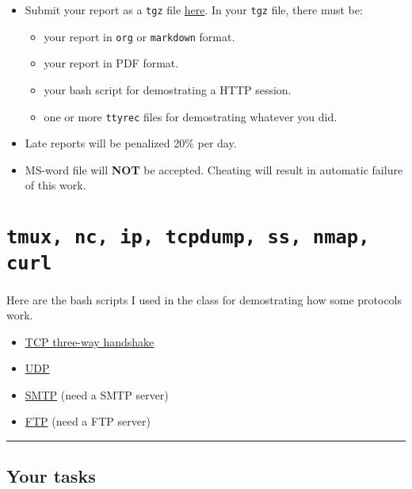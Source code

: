\documentclass{article}
\begin{document}
\begin{itemize}
\item Submit your report as a \texttt{tgz} file \href{https://cs6.swfu.edu.cn/moodle/mod/assign/view.php?id=777}{here}. In your \texttt{tgz} file, there
must be:

\begin{itemize}
\item your report in \texttt{org} or \texttt{markdown} format.
\item your report in PDF format.
\item your bash script for demostrating a HTTP session.
\item one or more \texttt{ttyrec} files for demostrating whatever you did.
\end{itemize}

\item Late reports will be penalized 20\% per day.

\item MS-word file will \textbf{NOT} be accepted. Cheating will result in automatic failure of this work.
\end{itemize}

\section{\texttt{tmux, nc, ip, tcpdump, ss, nmap, curl}}
\label{sec:orgef2e17f}

Here are the bash scripts I used in the class for demostrating how some protocols work.

\begin{itemize}
\item \href{https://cs6.swfu.edu.cn/\~wx672/lecture\_notes/network\_basics/scripts/tmux-demo-3way.handshake.sh}{TCP three-way handshake}
\item \href{https://cs6.swfu.edu.cn/\~wx672/lecture\_notes/network\_basics/scripts/tmux-demo-udp.sh}{UDP}
\item \href{https://cs6.swfu.edu.cn/\~wx672/lecture\_notes/network\_basics/scripts/tmux-demo-smtp.sh}{SMTP} (need a SMTP server)
\item \href{https://cs6.swfu.edu.cn/\~wx672/lecture\_notes/network\_basics/scripts/tmux-demo-ftp.sh}{FTP} (need a FTP server)
\end{itemize}

\noindent\rule{\textwidth}{0.5pt}

\subsection{Your tasks}
\label{sec:org2619ca1}
\end{document}
